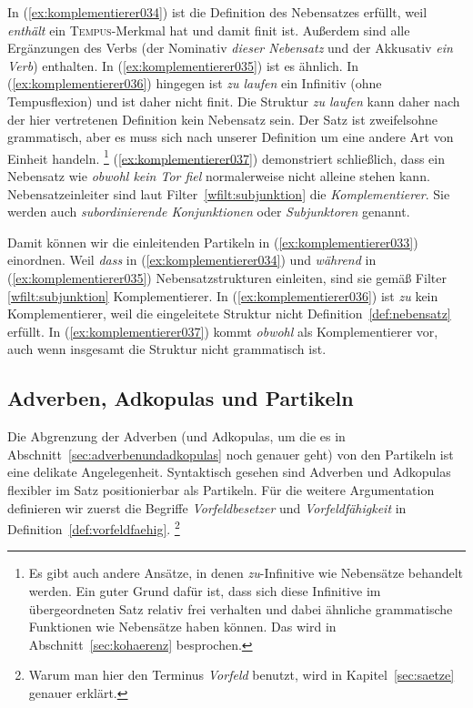 In (\ref{ex:komplementierer034}) ist die Definition des Nebensatzes erfüllt, weil \textit{enthält} ein \textsc{Tempus}-Merkmal hat und damit finit ist.
Außerdem sind alle Ergänzungen des Verbs (der Nominativ \textit{dieser Nebensatz} und der Akkusativ \textit{ein Verb}) enthalten.
In (\ref{ex:komplementierer035}) ist es ähnlich.
In (\ref{ex:komplementierer036}) hingegen ist \textit{zu laufen} ein Infinitiv (ohne Tempusflexion) und ist daher nicht finit.
Die Struktur \textit{zu laufen} kann daher nach der hier vertretenen Definition kein Nebensatz sein.
Der Satz ist zweifelsohne grammatisch, aber es muss sich nach unserer Definition um eine andere Art von Einheit handeln.%
\footnote{Es gibt auch andere Ansätze, in denen \textit{zu}-Infinitive wie Nebensätze behandelt werden.
Ein guter Grund dafür ist, dass sich diese Infinitive im übergeordneten Satz relativ frei verhalten und dabei ähnliche grammatische Funktionen wie Nebensätze haben können.
Das wird in Abschnitt~\ref{sec:kohaerenz} besprochen.}
(\ref{ex:komplementierer037}) demonstriert schließlich, dass ein Nebensatz wie \textit{obwohl kein Tor fiel} normalerweise nicht alleine stehen kann.
Nebensatzeinleiter sind laut Filter~\ref{wfilt:subjunktion} die \textit{Komplementierer}.
Sie werden auch \textit{subordinierende Konjunktionen} oder \textit{Subjunktoren} genannt.



Damit können wir die einleitenden Partikeln in (\ref{ex:komplementierer033}) einordnen.
Weil \textit{dass} in (\ref{ex:komplementierer034}) und \textit{während} in (\ref{ex:komplementierer035}) Nebensatzstrukturen einleiten, sind sie gemäß Filter \ref{wfilt:subjunktion} Komplementierer.
In (\ref{ex:komplementierer036}) ist \textit{zu} kein Komplementierer, weil die eingeleitete Struktur nicht Definition~\ref{def:nebensatz} erfüllt.
In (\ref{ex:komplementierer037}) kommt \textit{obwohl} als Komplementierer vor, auch wenn insgesamt die Struktur nicht grammatisch ist.


\subsection{Adverben, Adkopulas und Partikeln}
\label{sec:adverbenadkopulasundpartikeln}


Die Abgrenzung der Adverben (und Adkopulas, um die es in Abschnitt~\ref{sec:adverbenundadkopulas} noch genauer geht) von den Partikeln ist eine delikate Angelegenheit.
Syntaktisch gesehen sind Adverben und Adkopulas flexibler im Satz positionierbar als Partikeln.
Für die weitere Argumentation definieren wir zuerst die Begriffe \textit{Vorfeldbesetzer} und \textit{Vorfeldfähigkeit} in Definition~\ref{def:vorfeldfaehig}.%
\footnote{Warum man hier den Terminus \textit{Vorfeld} benutzt, wird in Kapitel~\ref{sec:saetze} genauer erklärt.}

